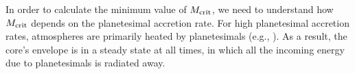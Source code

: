 \documentclass[apj]{emulateapj}
\begin{document}






In order to calculate the minimum value of $M_{\rm crit}$, we need to understand how $M_{\rm crit}$ depends on the planetesimal accretion rate.
For high planetesimal accretion rates, atmospheres are primarily heated by planetesimals (e.g., \citealt{rafikov06}). As a result, the core's envelope is in a steady state at all times, in which all the incoming energy due to planetesimals is radiated away.  %
\end{document}
